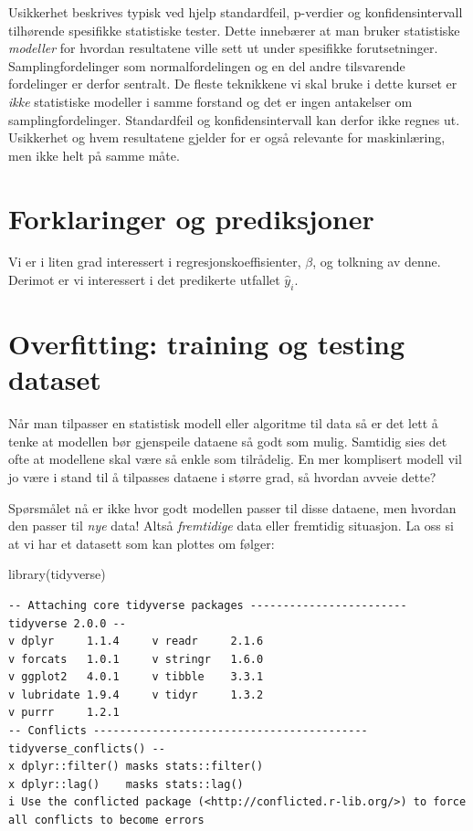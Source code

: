 \documentclass[
  letterpaper,
  DIV=11,
  numbers=noendperiod]{scrreprt}
\newenvironment{Shaded}{\begin{snugshade}}{\end{snugshade}}
\newcommand{\FunctionTok}[1]{\textcolor[rgb]{0.28,0.35,0.67}{#1}}
\newcommand{\NormalTok}[1]{\textcolor[rgb]{0.00,0.23,0.31}{#1}}
\begin{document}
Usikkerhet beskrives typisk ved hjelp standardfeil, p-verdier og
konfidensintervall tilhørende spesifikke statistiske tester. Dette
innebærer at man bruker statistiske \emph{modeller} for hvordan
resultatene ville sett ut under spesifikke forutsetninger.
Samplingfordelinger som normalfordelingen og en del andre tilsvarende
fordelinger er derfor sentralt. De fleste teknikkene vi skal bruke i
dette kurset er \emph{ikke} statistiske modeller i samme forstand og det
er ingen antakelser om samplingfordelinger. Standardfeil og
konfidensintervall kan derfor ikke regnes ut. Usikkerhet og hvem
resultatene gjelder for er også relevante for maskinlæring, men ikke
helt på samme måte.

\section{Forklaringer og
prediksjoner}\label{forklaringer-og-prediksjoner}

Vi er i liten grad interessert i regresjonskoeffisienter, \(\beta\), og
tolkning av denne. Derimot er vi interessert i det predikerte utfallet
\(\hat{y}_i\).

\section{Overfitting: training og testing
dataset}\label{overfitting-training-og-testing-dataset}

Når man tilpasser en statistisk modell eller algoritme til data så er
det lett å tenke at modellen bør gjenspeile dataene så godt som mulig.
Samtidig sies det ofte at modellene skal være så enkle som tilrådelig.
En mer komplisert modell vil jo være i stand til å tilpasses dataene i
større grad, så hvordan avveie dette?

Spørsmålet nå er ikke hvor godt modellen passer til disse dataene, men
hvordan den passer til \emph{nye} data! Altså \emph{fremtidige} data
eller fremtidig situasjon. La oss si at vi har et datasett som kan
plottes om følger:

\begin{Shaded}
\begin{Highlighting}[]
\FunctionTok{library}\NormalTok{(tidyverse)}
\end{Highlighting}
\end{Shaded}

\begin{verbatim}
-- Attaching core tidyverse packages ------------------------ tidyverse 2.0.0 --
v dplyr     1.1.4     v readr     2.1.6
v forcats   1.0.1     v stringr   1.6.0
v ggplot2   4.0.1     v tibble    3.3.1
v lubridate 1.9.4     v tidyr     1.3.2
v purrr     1.2.1     
-- Conflicts ------------------------------------------ tidyverse_conflicts() --
x dplyr::filter() masks stats::filter()
x dplyr::lag()    masks stats::lag()
i Use the conflicted package (<http://conflicted.r-lib.org/>) to force all conflicts to become errors
\end{verbatim}
\end{document}
